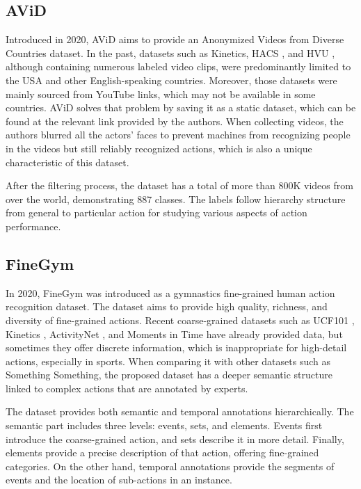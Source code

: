 \documentclass[a4paper]{article}
\begin{document}
\subsection{AViD}
Introduced in 2020, AViD \cite{AViD} aims to provide an Anonymized Videos from Diverse Countries dataset. In the past, datasets such as Kinetics, HACS \cite{HACS}, and HVU \cite{HVU}, although containing numerous labeled video clips, were predominantly limited to the USA and other English-speaking countries. Moreover, those datasets were mainly sourced from YouTube links, which may not be available in some countries. AViD solves that problem by saving it as a static dataset, which can be found at the relevant link provided by the authors. When collecting videos, the authors blurred all the actors' faces to prevent machines from recognizing people in the videos but still reliably recognized actions, which is also a unique characteristic of this dataset.

After the filtering process, the dataset has a total of more than 800K videos from over the world, demonstrating 887 classes. The labels follow hierarchy structure from general to particular action for studying various aspects of action performance.
\subsection{FineGym}
In 2020, FineGym \cite{FineGym} was introduced as a gymnastics fine-grained human action recognition dataset. The dataset aims to provide high quality, richness, and diversity of fine-grained actions. Recent coarse-grained datasets such as UCF101 \cite{UCF101}, Kinetics \cite{Kinetics-400}, ActivityNet \cite{ActivityNet}, and Moments in Time \cite{MomentsinTime} have already provided data, but sometimes they offer discrete information, which is inappropriate for high-detail actions, especially in sports. When comparing it with other datasets such as Something Something, the proposed dataset has a deeper semantic structure linked to complex actions that are annotated by experts.

The dataset provides both semantic and temporal annotations hierarchically. The semantic part includes three levels: events, sets, and elements. Events first introduce the coarse-grained action, and sets describe it in more detail. Finally, elements provide a precise description of that action, offering fine-grained categories. On the other hand, temporal annotations provide the segments of events and the location of sub-actions in an instance. 
\end{document}
